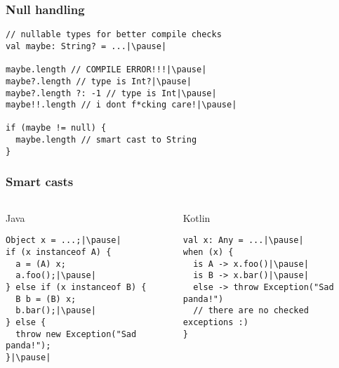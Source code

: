 
\begin{withoutheadline}
\end{withoutheadline}

\begin{frame}[fragile] \frametitle{Null handling}
\pause
\begin{lstlisting}
// nullable types for better compile checks
val maybe: String? = ...|\pause|

maybe.length // COMPILE ERROR!!!|\pause|
maybe?.length // type is Int?|\pause|
maybe?.length ?: -1 // type is Int|\pause|
maybe!!.length // i dont f*cking care!|\pause|

if (maybe != null) {
  maybe.length // smart cast to String
}
\end{lstlisting}
\end{frame}



\begin{frame}[fragile]
\frametitle{Smart casts}
\pause
\begin{columns}[t]
\begin{column}{0.5\textwidth}
\begin{center}
  Java
\end{center}
\begin{lstlisting}[style=twosided]
Object x = ...;|\pause|
if (x instanceof A) {
  a = (A) x;
  a.foo();|\pause|
} else if (x instanceof B) {
  B b = (B) x;
  b.bar();|\pause|
} else {
  throw new Exception("Sad panda!");
}|\pause|
\end{lstlisting}
\end{column}
\begin{column}{0.5\textwidth}
\begin{center}
  Kotlin
\end{center}
\begin{lstlisting}[style=twosided]
val x: Any = ...|\pause|
when (x) {
  is A -> x.foo()|\pause|
  is B -> x.bar()|\pause|
  else -> throw Exception("Sad panda!")
  // there are no checked exceptions :)
}
\end{lstlisting}
\end{column}
\end{columns}
\end{frame}


